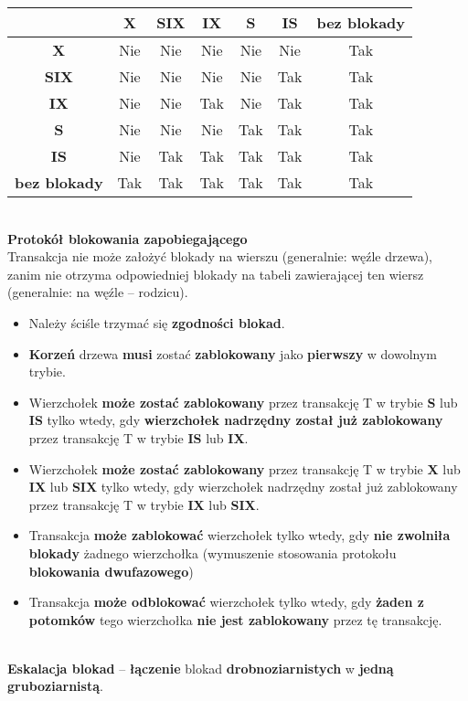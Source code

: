 \documentclass[a4paper]{article}
\begin{document}
\begin{tabular}{|c|c|c|c|c|c|c|}
\hline
    & \textbf{X} & \textbf{SIX} & \textbf{IX} & \textbf{S} & \textbf{IS} & \textbf{bez blokady}\\
\hline
    \textbf{X} & Nie & Nie & Nie & Nie & Nie & Tak\\
\hline     
    \textbf{SIX} & Nie & Nie & Nie & Nie & Tak & Tak\\
\hline     
    \textbf{IX} & Nie & Nie & Tak & Nie & Tak & Tak\\
\hline     
    \textbf{S} & Nie & Nie & Nie & Tak & Tak & Tak\\
\hline     
    \textbf{IS} & Nie & Tak & Tak & Tak & Tak & Tak\\
\hline     
    \textbf{bez blokady} & Tak & Tak & Tak & Tak & Tak & Tak\\
\hline
\end{tabular}

\hfill \\
\textbf{Protokół blokowania zapobiegającego}\\
Transakcja nie może założyć blokady na wierszu (generalnie: węźle drzewa), zanim nie otrzyma odpowiedniej blokady na tabeli zawierającej ten wiersz (generalnie: na węźle – rodzicu).
\begin{itemize}
    \item Należy ściśle trzymać się \textbf{zgodności blokad}.
    \item \textbf{Korzeń} drzewa \textbf{musi} zostać \textbf{zablokowany} jako \textbf{pierwszy} w dowolnym trybie.
    \item Wierzchołek \textbf{może zostać zablokowany} przez transakcję T w trybie \textbf{S} lub \textbf{IS} tylko wtedy, gdy \textbf{wierzchołek nadrzędny został już zablokowany} przez transakcję T w trybie \textbf{IS} lub \textbf{IX}.
    \item Wierzchołek \textbf{może zostać zablokowany} przez transakcję T w trybie \textbf{X} lub \textbf{IX} lub \textbf{SIX} tylko wtedy, gdy wierzchołek nadrzędny został już zablokowany przez transakcję T w trybie \textbf{IX} lub \textbf{SIX}.
    \item Transakcja \textbf{może zablokować} wierzchołek tylko wtedy, gdy \textbf{nie zwolniła blokady} żadnego wierzchołka (wymuszenie stosowania protokołu \textbf{blokowania dwufazowego})
    \item Transakcja \textbf{może odblokować} wierzchołek tylko wtedy, gdy \textbf{żaden z potomków} tego wierzchołka \textbf{nie jest zablokowany} przez tę transakcję.
\end{itemize}
\hfill \\
\textbf{Eskalacja blokad} – \textbf{łączenie} blokad \textbf{drobnoziarnistych} w \textbf{jedną gruboziarnistą}.
\end{document}
